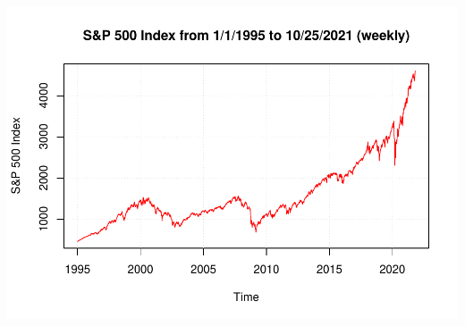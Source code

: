 \documentclass[
]{book}
\begin{document}
\includegraphics{02-Time-Series-Basics_files/figure-latex/unnamed-chunk-15-1.pdf}
\end{document}
